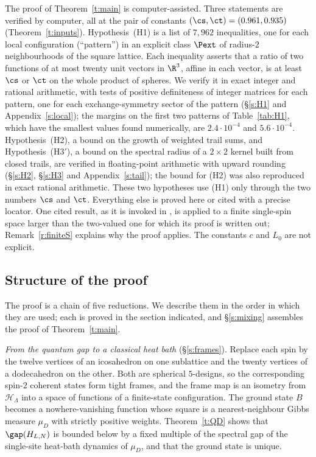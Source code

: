 The proof of Theorem~\ref{t:main} is computer-assisted. Three statements are verified by computer, all at the pair of constants $(\cs, \ct) = (0.961, 0.935)$ (Theorem~\ref{t:inputs}). Hypothesis~(H1) is a list of $7{,}962$ inequalities, one for each local configuration (``pattern'') in an explicit class $\Pext$ of radius-$2$ neighbourhoods of the square lattice. Each inequality asserts that a ratio of two functions of at most twenty unit vectors in $\R^3$, affine in each vector, is at least $\cs$ or $\ct$ on the whole product of spheres. We verify it in exact integer and rational arithmetic, with tests of positive definiteness of integer matrices for each pattern, one for each exchange-symmetry sector of the pattern (\S\ref{s:H1} and Appendix~\ref{s:local}); the margins on the first two patterns of Table~\ref{tab:H1}, which have the smallest values found numerically, are $2.4 \cdot 10^{-4}$ and $5.6 \cdot 10^{-4}$. Hypothesis~(H2), a bound on the growth of weighted trail sums, and Hypothesis~(H3$'$), a bound on the spectral radius of a $2 \times 2$ kernel built from closed trails, are verified in floating-point arithmetic with upward rounding (\S\ref{s:H2}, \S\ref{s:H3} and Appendix~\ref{s:tail}); the bound for (H2) was also reproduced in exact rational arithmetic. These two hypotheses use (H1) only through the two numbers $\cs$ and $\ct$. Everything else is proved here or cited with a precise locator. One cited result, \cite[Theorem~4.1]{MO94} as it is invoked in \cite{MOS94}, is applied to a finite single-spin space larger than the two-valued one for which its proof is written out; Remark~\ref{r:finiteS} explains why the proof applies. The constants $c$ and $L_0$ are not explicit.

\subsection{Structure of the proof}

The proof is a chain of five reductions. We describe them in the order in which they are used; each is proved in the section indicated, and \S\ref{s:mixing} assembles the proof of Theorem~\ref{t:main}.

\emph{From the quantum gap to a classical heat bath} (\S\ref{s:frames}). Replace each spin by the twelve vertices of an icosahedron on one sublattice and the twenty vertices of a dodecahedron on the other. Both are spherical $5$-designs, so the corresponding spin-$2$ coherent states form tight frames, and the frame map is an isometry from $\mathcal H_\Lambda$ into a space of functions of a finite-state configuration. The ground state $B$ becomes a nowhere-vanishing function whose square is a nearest-neighbour Gibbs measure $\mu_D$ with strictly positive weights. Theorem~\ref{t:QD} shows that $\gap(H_{L, N})$ is bounded below by a fixed multiple of the spectral gap of the single-site heat-bath dynamics of $\mu_D$, and that the ground state is unique.

